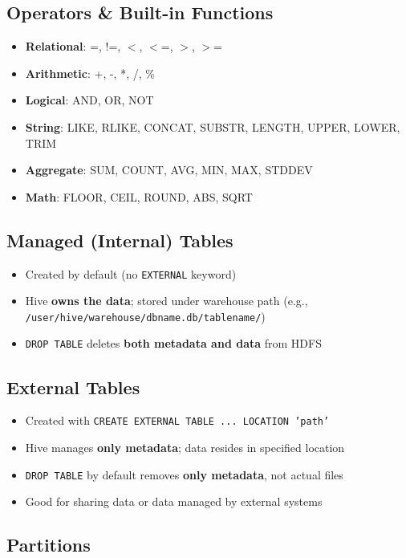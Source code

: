 \documentclass[11pt, onecolumn, a4paper]{article}
\begin{document}
\subsection{Operators \& Built-in Functions}

\begin{itemize}
  \item \textbf{Relational}: =, !=, $<$, $<$=, $>$, $>$=
  \item \textbf{Arithmetic}: +, -, *, /, \%
  \item \textbf{Logical}: AND, OR, NOT
  \item \textbf{String}: LIKE, RLIKE, CONCAT, SUBSTR, LENGTH, UPPER, LOWER, TRIM
  \item \textbf{Aggregate}: SUM, COUNT, AVG, MIN, MAX, STDDEV
  \item \textbf{Math}: FLOOR, CEIL, ROUND, ABS, SQRT
\end{itemize}

\subsection{Managed (Internal) Tables}

\begin{itemize}
  \item Created by default (no \texttt{EXTERNAL} keyword)
  \item Hive \textbf{owns the data}; stored under warehouse path (e.g., \texttt{/user/hive/warehouse/dbname.db/tablename/})
  \item \texttt{DROP TABLE} deletes \textbf{both metadata and data} from HDFS
\end{itemize}

\subsection{External Tables}

\begin{itemize}
  \item Created with \texttt{CREATE EXTERNAL TABLE ... LOCATION 'path'}
  \item Hive manages \textbf{only metadata}; data resides in specified location
  \item \texttt{DROP TABLE} by default removes \textbf{only metadata}, not actual files
  \item Good for sharing data or data managed by external systems
\end{itemize}

\subsection{Partitions}
\end{document}
